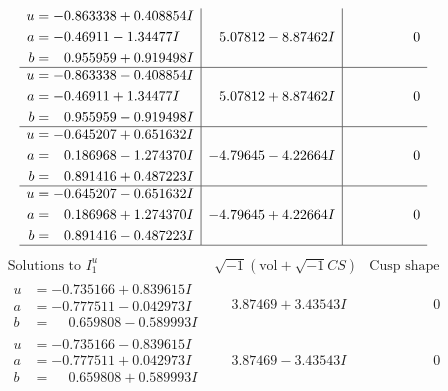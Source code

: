 \documentclass[1p]{elsarticle_modified}
\theoremstyle{definition}
\newcommand{\I}{\sqrt{-1}}
\begin{document}
$$\begin{array}{c|c|c}
\begin{aligned}
u &= -0.863338 + 0.408854 I \\
a &= -0.46911 - 1.34477 I \\
b &= \phantom{-}0.955959 + 0.919498 I\end{aligned}
 & \phantom{-}5.07812 - 8.87462 I & \phantom{-0.000000 } 0 \\ \hline\begin{aligned}
u &= -0.863338 - 0.408854 I \\
a &= -0.46911 + 1.34477 I \\
b &= \phantom{-}0.955959 - 0.919498 I\end{aligned}
 & \phantom{-}5.07812 + 8.87462 I & \phantom{-0.000000 } 0 \\ \hline\begin{aligned}
u &= -0.645207 + 0.651632 I \\
a &= \phantom{-}0.186968 - 1.274370 I \\
b &= \phantom{-}0.891416 + 0.487223 I\end{aligned}
 & -4.79645 - 4.22664 I & \phantom{-0.000000 } 0 \\ \hline\begin{aligned}
u &= -0.645207 - 0.651632 I \\
a &= \phantom{-}0.186968 + 1.274370 I \\
b &= \phantom{-}0.891416 - 0.487223 I\end{aligned}
 & -4.79645 + 4.22664 I & \phantom{-0.000000 } 0\\
 \hline 
 \end{array}$$\newpage$$\begin{array}{c|c|c}  
\text{Solutions to }I^u_{1}& \I (\text{vol} + \sqrt{-1}CS) & \text{Cusp shape}\\
 \hline 
\begin{aligned}
u &= -0.735166 + 0.839615 I \\
a &= -0.777511 - 0.042973 I \\
b &= \phantom{-}0.659808 - 0.589993 I\end{aligned}
 & \phantom{-}3.87469 + 3.43543 I & \phantom{-0.000000 } 0 \\ \hline\begin{aligned}
u &= -0.735166 - 0.839615 I \\
a &= -0.777511 + 0.042973 I \\
b &= \phantom{-}0.659808 + 0.589993 I\end{aligned}
 & \phantom{-}3.87469 - 3.43543 I & \phantom{-0.000000 } 0 \\ \hline\begin{aligned}

\end{aligned}
\end{array}$$
\end{document}
